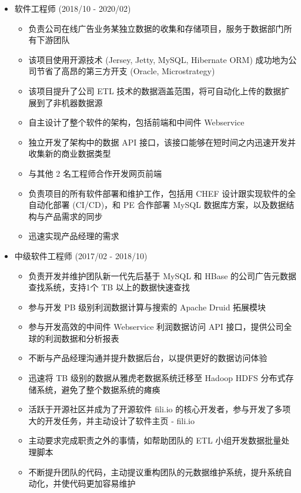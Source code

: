 \documentclass[10pt,a4paper,ragged2e,withhyper]{altacv}
\begin{document}
    \begin{itemize}
    \item 软件工程师 (2018/10 - 2020/02)
    \begin{itemize}
        \item 负责公司在线广告业务某独立数据的收集和存储项目，服务于数据部门所有下游团队
        \item 该项目使用开源技术 (Jersey, Jetty, MySQL, Hibernate ORM) 成功地为公司节省了高昂的第三方开支    (Oracle, Microstrategy)
        \item 该项目提升了公司 ETL 技术的数据涵盖范围，将可自动化上传的数据扩展到了非机器数据源
        \item 自主设计了整个软件的架构，包括前端和中间件 Webservice
        \item 独立开发了架构中的数据 API 接口，该接口能够在短时间之内迅速开发并收集新的商业数据类型
        \item 与其他 2 名工程师合作开发网页前端
        \item 负责项目的所有软件部署和维护工作，包括用 CHEF 设计跟实现软件的全自动化部署 (CI/CD)，和 PE 合作部署 MySQL 数据库方案，以及数据结构与产品需求的同步
        \item 迅速实现产品经理的需求
    \end{itemize}
    \item 中级软件工程师 (2017/02 - 2018/10)
    \begin{itemize}
        \item 负责开发并维护团队新一代先后基于 MySQL 和 HBase 的公司广告元数据查找系统，支持1个 TB 以上的数据快速查找
        \item 参与开发 PB 级别利润数据计算与搜索的 Apache Druid 拓展模块
        \item 参与开发高效的中间件 Webservice 利润数据访问 API 接口，提供公司全球的利润数据和分析报表
        \item 不断与产品经理沟通并提升数据后台，以提供更好的数据访问体验
        \item 迅速将 TB 级别的数据从雅虎老数据系统迁移至 Hadoop HDFS 分布式存储系统，避免了整个数据系统的瘫痪
        \item 活跃于开源社区并成为了开源软件 fili.io 的核心开发者，参与开发了多项大的开发任务，并主动设计了软件主页 - fili.io
        \item 主动要求完成职责之外的事情，如帮助团队的 ETL 小组开发数据批量处理脚本
        \item 不断提升团队的代码，主动提议重构团队的元数据维护系统，提升系统自动化，并使代码更加容易维护
    \end{itemize}

\end{itemize}
\end{document}
